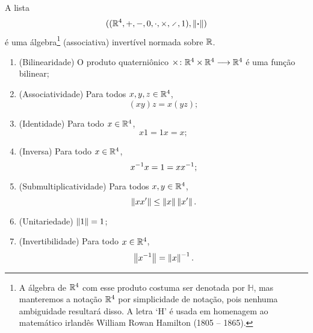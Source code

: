 \begin{proposition}
A lista
	\begin{equation*}
	((\R^4,+,-,0,\cdot,\times,\div,1),\nor{\var})
	\end{equation*}
é uma álgebra\footnote{A álgebra de $\mathbb{R}^4$ com esse produto costuma ser denotada por $\mathbb{H}$, mas manteremos a notação $\mathbb{R}^4$ por simplicidade de notação, pois nenhuma ambiguidade resultará disso. A letra `H' é usada em homenagem ao matemático irlandês William Rowan Hamilton (1805 -- 1865).} (associativa) invertível normada sobre $\mathbb{R}$.
\begin{enumerate}
	\item (Bilinearidade) O produto quaterniônico ${\times}\colon {\mathbb{R}^4 \times \mathbb{R}^4} \longrightarrow {\mathbb{R}^4}$ é uma função bilinear;
	\item (Associatividade) Para todos $x,y,z \in \mathbb{R}^4$,
		\begin{equation*}
		(xy)z = x(yz);
		\end{equation*}
	\item (Identidade) Para todo $x \in \mathbb{R}^4$,
		\begin{equation*}
		x1 = 1x = x;
		\end{equation*}
	\item (Inversa) Para todo $x \in \mathbb{R}^4$,
		\begin{equation*}
		x^{-1} x = 1 = xx^{-1};
		\end{equation*}
	\item (Submultiplicatividade) Para todos $x,y \in \mathbb{R}^4$,
		\begin{equation*}
		\left\Vert{xx'}\right\Vert \leq \left\Vert{x}\right\Vert\left\Vert{x'}\right\Vert.
		\end{equation*}
	\item (Unitariedade) $\left\Vert{1}\right\Vert=1$;
	\item (Invertibilidade) Para todo $x \in \mathbb{R}^4$,
		\begin{equation*}
		\left\Vert{x^{-1}}\right\Vert = \left\Vert{x}\right\Vert^{-1}.
		\end{equation*}
\end{enumerate}
\end{proposition}
